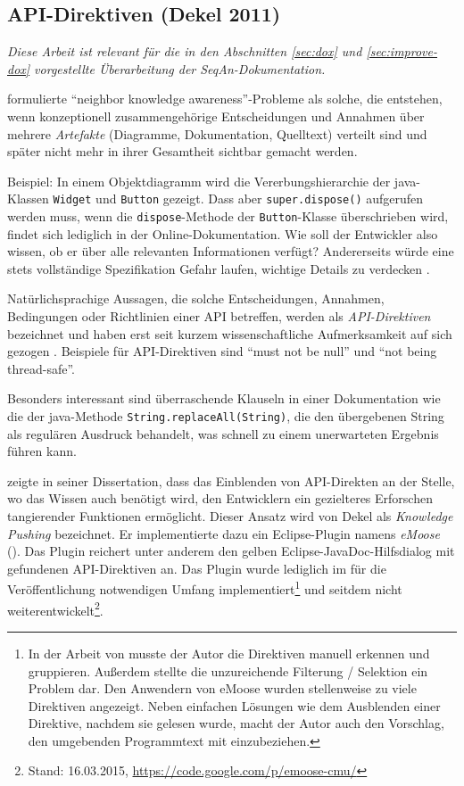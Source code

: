 \subsection{API-Direktiven (Dekel 2011)}
\label{sec:api-directives}

\begin{important}
\textit{Diese Arbeit ist relevant für die in den Abschnitten \ref{sec:dox} und \ref{sec:improve-dox} vorgestellte Überarbeitung der SeqAn-Dokumentation.}

\cite{dekel2011increasing} formulierte ``neighbor knowledge awareness''-Probleme als solche, die entstehen, wenn konzeptionell zusammengehörige Entscheidungen und Annahmen über mehrere \emph{Artefakte} (Diagramme, Dokumentation, Quelltext) verteilt sind und später nicht mehr in ihrer Gesamtheit sichtbar gemacht werden.

Beispiel: In einem Objektdiagramm wird die Vererbungshierarchie der \gls{java}-Klassen \texttt{Widget} und \texttt{Button} gezeigt. Dass aber \texttt{super.dispose()} aufgerufen werden muss, wenn die \texttt{dispose}-Methode der \texttt{Button}-Klasse überschrieben wird, findet sich lediglich in der Online-Dokumentation. Wie soll der Entwickler also wissen, ob er über alle relevanten Informationen verfügt? Andererseits würde eine stets vollständige Spezifikation Gefahr laufen, wichtige Details zu verdecken \citep{dekel2011increasing}. 

Natürlichsprachige Aussagen, die solche Entscheidungen, Annahmen, Bedingungen oder Richtlinien einer API betreffen, werden als \emph{API-Direktiven} bezeichnet und haben erst seit kurzem wissenschaftliche Aufmerksamkeit auf sich gezogen \citep{dekel2011increasing,Monperrus:2011bf}. Beispiele für API-Direktiven sind ``must not be null'' und ``not being thread-safe''.

Besonders interessant sind überraschende Klauseln in einer Dokumentation wie die der \gls{java}-Methode \texttt{String.replaceAll(String)}, die den übergebenen String als regulären Ausdruck behandelt, was schnell zu einem unerwarteten Ergebnis führen kann.

\cite{dekel2011increasing} zeigte in seiner Dissertation, dass das Einblenden von API-Direkten an der Stelle, wo das Wissen auch benötigt wird, den Entwicklern ein gezielteres Erforschen tangierender Funktionen ermöglicht. Dieser Ansatz wird von Dekel als \textit{Knowledge Pushing} bezeichnet. Er implementierte dazu ein Eclipse-Plugin namens \textit{eMoose} (). Das Plugin reichert unter anderem den gelben Eclipse-JavaDoc-Hilfsdialog mit gefundenen API-Direktiven an. Das Plugin wurde lediglich im für die Veröffentlichung notwendigen Umfang implementiert\footnote{In der Arbeit von \cite{dekel2011increasing} musste der Autor die Direktiven manuell erkennen und gruppieren. Außerdem stellte die unzureichende Filterung / Selektion ein Problem dar. Den Anwendern von eMoose wurden stellenweise zu viele Direktiven angezeigt. Neben einfachen Lösungen wie dem Ausblenden einer Direktive, nachdem sie gelesen wurde, macht der Autor auch den Vorschlag, den umgebenden Programmtext mit einzubeziehen.} und seitdem nicht weiterentwickelt\footnote{Stand: 16.03.2015, \url{https://code.google.com/p/emoose-cmu/}}.


\end{important}
